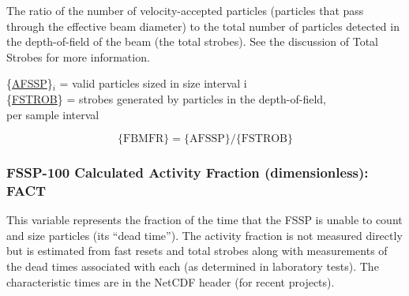 \documentclass[
]{book}
\begin{document}
The ratio of the number of velocity-accepted particles (particles that pass through the effective beam diameter) to the total number of particles detected in the depth-of-field of the beam (the total strobes). See the discussion of Total Strobes for more information.

\{\href{./5-cloud-physics-variables.html\#CRPC}{AFSSP}\}\(_{i}\) = valid particles sized in size interval i\\
\{\protect\hyperlink{fstrob}{FSTROB}\} = strobes generated by particles in the depth-of-field,\\
\hspace*{0.333em}\hspace*{0.333em}\hspace*{0.333em}\hspace*{0.333em}\hspace*{0.333em}\hspace*{0.333em}\hspace*{0.333em}\hspace*{0.333em}\hspace*{0.333em}\hspace*{0.333em}\hspace*{0.333em}\hspace*{0.333em}\hspace*{0.333em}\hspace*{0.333em}per sample interval

\begin{equation}
\mathrm{\{FBMFR\}=\{AFSSP\}/\{FSTROB\}}
\label{eq:FBMFRbox}
\end{equation}

\hypertarget{fact}{%
\subsubsection*{FSSP-100 Calculated Activity Fraction (dimensionless): FACT}\label{fact}}

This variable represents the fraction of the time that the FSSP is unable to count and size particles (its ``dead time''). The activity fraction is not measured directly but is estimated from fast resets and total strobes along with measurements of the dead times associated with each (as determined in laboratory tests). The characteristic times are in the NetCDF header (for recent projects).
\end{document}
